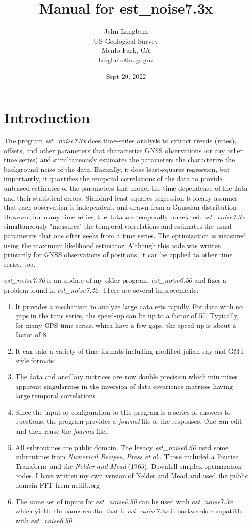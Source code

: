 \documentclass[12pt]{amsart}
\title{Manual for est\_noise7.3x}
\author{John Langbein \\
US Geological Survey \\
Menlo Park, CA \\
langbein@usgs.gov}
\date{Sept 20, 2022}                                        %
\begin{document}
\maketitle
\section{Introduction}

The program \textit{est\_noise7.3x} does time-series analysis to extract trends (rates), offsets, and other
parameters that characterize GNSS observations (or any other time series) and simultaneously estimates the parameters the characterize the background noise
of the data. Basically, it does least-squares regression, but importantly, it quantifies the temporal correlations of the data to
provide unbiased estimates of the parameters that model the time-dependence of the data and their statistical errors. Standard least-squares regression typically assumes that each observation is independent, and drawn from a Gaussian distribution. However, for many time series, the data are temporally correlated.  \textit{est\_noise7.3x} simultaneously "measures" the temporal correlations and estimates the usual parameters that one often seeks from a time series.
The optimization is measured using the maximum likelihood estimator.  Although this code was written primarily for
GNSS observations of positions, it can be applied to other time series, too.

\textit{est\_noise7.30} is an update of my older program, \textit{est\_noise6.50} and fixes a problem found in \textit{est\_noise7.22}.  There are several improvements:
\begin{enumerate}
\item {It provides a mechanism to analyze large data sets rapidly. For data with no gaps in the time series, the speed-up
can be up to a factor of 50. Typically, for many GPS time series, which have a few gaps, the speed-up is about a factor of 8.}
\item {It can take a variety of time formats including modified julian day and GMT style formats}
\item {The data and ancillary matrices are now double precision which minimizes apparent singularities in the inversion of data
covariance matrices having large temporal correlations.}
\item {Since the input or configuration to this program is a series of answers to questions, the program provides a
\textit{journal} file of the responses.  One can edit and then reuse the \textit{journal} file.}
\item {All subroutines are public domain. The legacy \textit{est\_noise6.50} used some subroutines from \textit{Numerical Recipes, Press et al.}. Those included a Fourier Transform, and the  \textit{Nelder and Mead} (1965), Downhill simplex optimization codes.
I have written my own version of Nelder and Mead and used the public domain FFT from netlib.org}
\item {The same set of inputs for \textit{est\_noise6.50} can be used with \textit{est\_noise7.3x} which yields the same
results; that is  \textit{est\_noise7.3x} is backwards compatible with  \textit{est\_noise6.50}.}
\end{enumerate}
\end{document}
